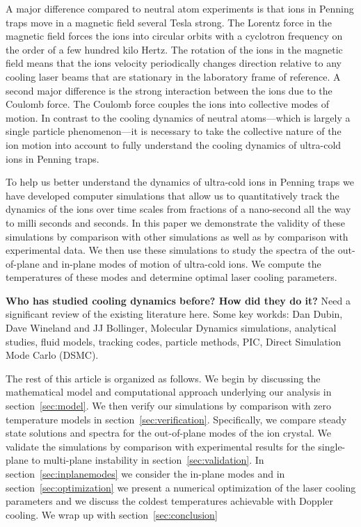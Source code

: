 \documentclass[aps, pra, twocolumn]{revtex4-1}
\begin{document}
A major difference compared to neutral atom experiments is that
ions in Penning traps move in a magnetic field several Tesla
strong. The Lorentz force in the magnetic field forces the ions
into circular orbits with a cyclotron frequency on the order of a
few hundred kilo Hertz. The rotation of the ions in the magnetic
field means that the ions velocity periodically changes direction
relative to any cooling laser beams that are stationary in the
laboratory frame of reference. A second major difference is the
strong interaction between the ions due to the Coulomb force. The
Coulomb force couples the ions into collective modes of motion.
In contrast to the cooling dynamics of neutral atoms---which is
largely a single particle phenomenon---it is necessary to take
the collective nature of the ion motion into account to fully
understand the cooling dynamics of ultra-cold ions in Penning
traps.

To help us better understand the dynamics of ultra-cold ions in
Penning traps we have developed computer simulations that allow
us to quantitatively track the dynamics of the ions over time
scales from fractions of a nano-second all the way to milli
seconds and seconds. In this paper we demonstrate the validity of
these simulations by comparison with other simulations as well as
by comparison with experimental data. We then use these
simulations to study the spectra of the out-of-plane and in-plane
modes of motion of ultra-cold ions. We compute the temperatures
of these modes and determine optimal laser cooling parameters.

{\bf Who has studied cooling dynamics before? How did they do
it?} Need a significant review of the existing literature here.
Some key workds: Dan Dubin, Dave Wineland and JJ Bollinger,
Molecular Dynamics simulations, analytical studies, fluid models,
tracking codes, particle methods, PIC, Direct Simulation Mode
Carlo (DSMC).

The rest of this article is organized as follows. We begin by
discussing the mathematical model and computational approach
underlying our analysis in section~\ref{sec:model}. We then
verify our simulations by comparison with zero temperature models
in section~\ref{sec:verification}. Specifically, we compare
steady state solutions and  spectra for the out-of-plane modes of the
ion crystal. We validate the simulations by comparison with
experimental results for the single-plane to multi-plane
instability in section~\ref{sec:validation}. In
section~\ref{sec:inplanemodes} we consider the in-plane modes and
in section~\ref{sec:optimization} we present a numerical
optimization of the laser cooling parameters and we discuss the
coldest temperatures achievable with Doppler cooling. We wrap up
with section~\ref{sec:conclusion}
\end{document}
